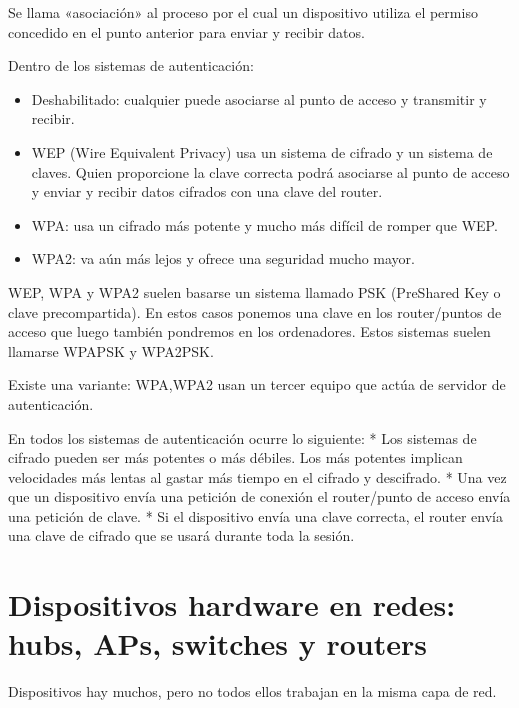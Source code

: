 \documentclass[letterpaper,10pt,spanish]{sphinxmanual}
\begin{document}
Se llama «asociación» al proceso por el cual un dispositivo utiliza el permiso concedido en el punto anterior para enviar y recibir datos.

Dentro de los sistemas de autenticación:
\begin{itemize}
\item {} 
Deshabilitado: cualquier puede asociarse al punto de acceso y transmitir y recibir.

\item {} 
WEP (Wire Equivalent Privacy) usa un sistema de cifrado y un sistema de claves. Quien proporcione la clave correcta podrá asociarse al punto de acceso y enviar y recibir datos cifrados con una clave del router.

\item {} 
WPA: usa un cifrado más potente y mucho más difícil de romper que WEP.

\item {} 
WPA2: va aún más lejos y ofrece una seguridad mucho mayor.

\end{itemize}

WEP, WPA y WPA2 suelen basarse un sistema llamado PSK (Pre\sphinxhyphen{}Shared Key o clave pre\sphinxhyphen{}compartida). En estos casos ponemos una clave en los router/puntos de acceso que luego también pondremos en los ordenadores. Estos sistemas suelen llamarse WPA\sphinxhyphen{}PSK y WPA2\sphinxhyphen{}PSK.

Existe una variante: WPA,WPA2 usan un tercer equipo que actúa de servidor de autenticación.

En todos los sistemas de autenticación ocurre lo siguiente:
* Los sistemas de cifrado pueden ser más potentes o más débiles. Los más potentes implican velocidades más lentas al gastar más tiempo en el cifrado y descifrado.
* Una vez que un dispositivo envía una petición de conexión el router/punto de acceso envía una petición de clave.
* Si el dispositivo envía una clave correcta, el router envía una clave de cifrado que se usará durante toda la sesión.


\section{Dispositivos hardware en redes: hubs, APs, switches y routers}
\label{\detokenize{t2_integracion_elementos/apuntes_t2:dispositivos-hardware-en-redes-hubs-aps-switches-y-routers}}
Dispositivos hay muchos, pero no todos ellos trabajan en la misma capa de red.
\end{document}
